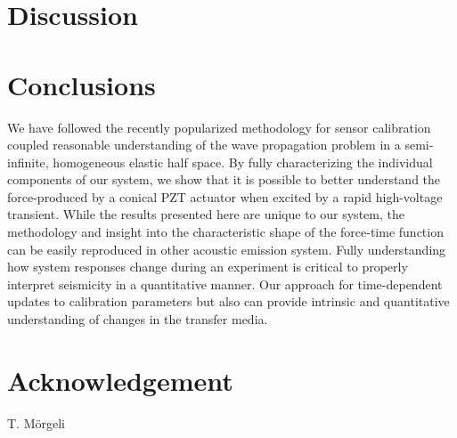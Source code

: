 \documentclass[preprint,3p, 11pt,authoryear]{elsarticle}
\begin{document}
{\section{Discussion}


\section{Conclusions}
We have followed the recently popularized methodology for sensor calibration coupled reasonable understanding of the wave propagation problem in a semi-infinite, homogeneous elastic half space. By fully characterizing the individual components of our system, we show that it is possible to better understand the force-produced by a conical PZT actuator when excited by a rapid high-voltage transient. While the results presented here are unique to our system, the methodology and insight into the characteristic shape of the force-time function can be easily reproduced in other acoustic emission system. Fully understanding how system responses change during an experiment is critical to properly interpret seismicity in a quantitative manner. Our approach for time-dependent updates to calibration parameters but also can provide intrinsic and quantitative understanding of changes in the transfer media.  
\section*{Acknowledgement}
T. M\"orgeli
 

}
\end{document}
